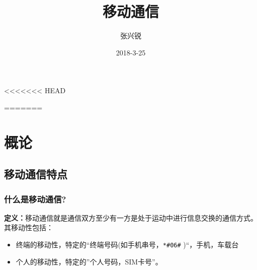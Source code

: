 \documentclass[a4paper ]{report}
\title{移动通信}
\author{张兴锐}
\date{2018-3-25}
\begin{document}
	\maketitle
	\tableofcontents
<<<<<<< HEAD
	
=======
	\chapter{概论}
	\section{移动通信特点}
	\subsection{什么是移动通信?}
	\textbf{定义：}移动通信就是通信双方至少有一方是处于运动中进行信息交换的通信方式。其移动性包括：
	\begin{itemize}
		\item 终端的移动性，特定的“终端号码(如手机串号，\verb|*#06#| )“，手机，车载台
		\item 个人的移动性，特定的”个人号码，SIM卡号”。
	\end{itemize}
\end{document}
